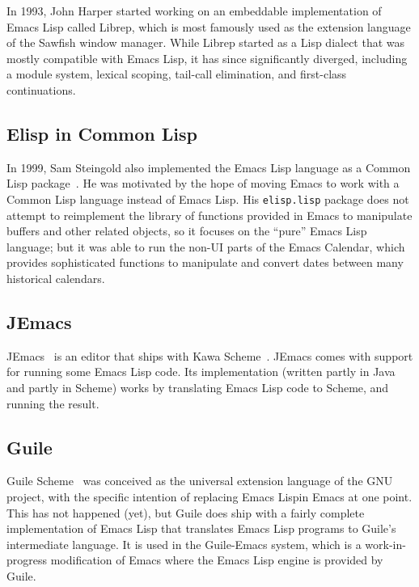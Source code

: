 \documentclass[format=acmsmall, review]{acmart}
\newcommand \Elisp {Emacs Lisp}
\begin{document}
In 1993, John Harper started working on an embeddable implementation of
\Elisp{} called Librep, which is most famously used as the extension
language of the Sawfish window manager.  While Librep started as a Lisp
dialect that was mostly compatible with \Elisp{}, it has since significantly
diverged, including a module system, lexical scoping, tail-call elimination,
and first-class continuations.

\subsection{Elisp in Common Lisp}

In 1999, Sam Steingold also implemented the \Elisp{} language as a Common
Lisp package~\cite{Steingold99}.  He was motivated by the hope of moving
Emacs to work with a Common Lisp language instead of \Elisp{}.
His \texttt{elisp.lisp} package does not attempt to reimplement the library
of functions provided in Emacs to manipulate buffers and other related
objects, so it focuses on the ``pure'' \Elisp{} language; but it was able to
run the non-UI parts of the Emacs Calendar, which provides sophisticated
functions to manipulate and convert dates between many historical calendars.

\subsection{JEmacs}

JEmacs~\cite{Bothner2001} is an editor that ships with Kawa
Scheme~\cite{KawaScheme}.  JEmacs comes with support for running some
\Elisp{} code.  Its implementation (written partly in Java and
partly in Scheme) works by translating \Elisp{} code to Scheme, and
running the result.

\subsection{Guile}

Guile Scheme~\cite{Guile2018} was conceived as the universal extension
language of the GNU project, with the specific intention of replacing
\Elisp in Emacs at one point.  This has not happened (yet), but Guile does
ship with a fairly complete implementation of \Elisp{} that translates
\Elisp{} programs to Guile's intermediate language.  It is used in the
Guile-Emacs system, which is a work-in-progress modification of Emacs where
the \Elisp{} engine is provided by Guile.
\end{document}
